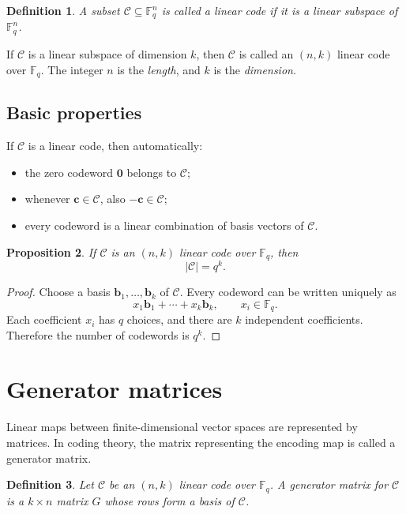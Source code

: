 \documentclass[11pt]{article}
\newtheorem{definition}{Definition}[section]
\newtheorem{proposition}[definition]{Proposition}
\newcommand{\F}{\mathbb{F}}
\newcommand{\code}{\mathcal{C}}
\newcommand{\vect}[1]{\bm{#1}}
\begin{document}
\begin{definition}
A subset \(\code\subseteq \F_q^n\) is called a \emph{linear code} if it is a linear subspace of \(\F_q^n\).
\end{definition}

If \(\code\) is a linear subspace of dimension \(k\), then \(\code\) is called an \((n,k)\) linear code over \(\F_q\). The integer \(n\) is the \emph{length}, and \(k\) is the \emph{dimension}.

\subsection{Basic properties}

If \(\code\) is a linear code, then automatically:
\begin{itemize}
  \item the zero codeword \(\vect 0\) belongs to \(\code\);
  \item whenever \(\vect c\in \code\), also \(-\vect c\in \code\);
  \item every codeword is a linear combination of basis vectors of \(\code\).
\end{itemize}

\begin{proposition}
If \(\code\) is an \((n,k)\) linear code over \(\F_q\), then
\[
|\code|=q^k.
\]
\end{proposition}

\begin{proof}
Choose a basis \(\vect b_1,\dots,\vect b_k\) of \(\code\). Every codeword can be written uniquely as
\[
x_1\vect b_1+\cdots+x_k\vect b_k,
\qquad x_i\in \F_q.
\]
Each coefficient \(x_i\) has \(q\) choices, and there are \(k\) independent coefficients. Therefore the number of codewords is \(q^k\).
\end{proof}

\section{Generator matrices}

Linear maps between finite-dimensional vector spaces are represented by matrices. In coding theory, the matrix representing the encoding map is called a generator matrix.

\begin{definition}
Let \(\code\) be an \((n,k)\) linear code over \(\F_q\). A \emph{generator matrix} for \(\code\) is a \(k\times n\) matrix \(G\) whose rows form a basis of \(\code\).
\end{definition}
\end{document}
